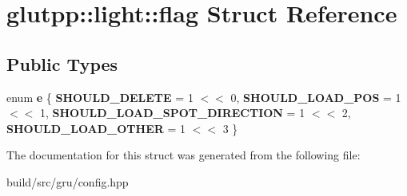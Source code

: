 \hypertarget{structglutpp_1_1light_1_1flag}{\section{glutpp\-:\-:light\-:\-:flag \-Struct \-Reference}
\label{structglutpp_1_1light_1_1flag}
}
\subsection*{\-Public \-Types}
\begin{DoxyCompactItemize}
\item 
enum {\bfseries e} \{ {\bfseries \-S\-H\-O\-U\-L\-D\-\_\-\-D\-E\-L\-E\-T\-E} =  1 $<$$<$ 0, 
{\bfseries \-S\-H\-O\-U\-L\-D\-\_\-\-L\-O\-A\-D\-\_\-\-P\-O\-S} =  1 $<$$<$ 1, 
{\bfseries \-S\-H\-O\-U\-L\-D\-\_\-\-L\-O\-A\-D\-\_\-\-S\-P\-O\-T\-\_\-\-D\-I\-R\-E\-C\-T\-I\-O\-N} =  1 $<$$<$ 2, 
{\bfseries \-S\-H\-O\-U\-L\-D\-\_\-\-L\-O\-A\-D\-\_\-\-O\-T\-H\-E\-R} =  1 $<$$<$ 3
 \}
\end{DoxyCompactItemize}


\-The documentation for this struct was generated from the following file\-:\begin{DoxyCompactItemize}
\item 
build/src/gru/config.\-hpp\end{DoxyCompactItemize}
